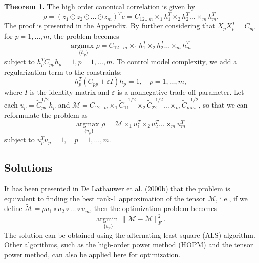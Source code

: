 \documentclass[a4paper,14pt]{article}
\renewcommand{\epsilon}{\ensuremath{\varepsilon}}
\theoremstyle{plain} %
\theoremstyle{definition} %
\theoremstyle{remark} %
\theoremstyle{definition}
\theoremstyle{remark}
\theoremstyle{remark}
\begin{document}
	\textbf{Theorem 1.} The high order canonical correlation is given by
	\[
	\rho = (z_1 \odot z_2 \odot \dots \odot z_m)^T e = C_{12\ldots m} \times_1 h_1^T \times_2 h_2^T \dots \times_m h_m^T.
	\]
	The proof is presented in the Appendix. By further considering that $X_p X_p^T = C_{pp}$ for $p = 1, \dots, m$, the problem becomes
	\[
	\underset{\{h_p\}}{\text{argmax }} \rho = C_{12\ldots m} \times_1 h_1^T \times_2 h_2^T \dots \times_m h_m^T
	\]
	subject to $h_p^T C_{pp} h_p = 1, p = 1, \dots, m$.
	To control model complexity, we add a regularization term to the constraints:
	\[
	h_p^T (C_{pp} + \epsilon I) h_p = 1, \quad p = 1, \dots, m,
	\]
	where $I$ is the identity matrix and $\epsilon$ is a nonnegative trade-off parameter. Let each $u_p = \tilde{C}_{pp}^{1/2} h_p$ and $\mathcal{M} = C_{12\ldots m} \times_1 \tilde{C}_{11}^{-1/2} \times_2 \tilde{C}_{22}^{-1/2} \dots \times_m \tilde{C}_{mm}^{-1/2}$, so that we can reformulate the problem as
	\[
	\underset{\{u_p\}}{\text{argmax }} \rho = \mathcal{M} \times_1 u_1^T \times_2 u_2^T \dots \times_m u_m^T
	\]
	subject to $u_p^T u_p = 1, \quad p = 1, \dots, m$.
	
	\subsection{Solutions}
	
	It has been presented in De Lathauwer et al. (2000b) that the problem is equivalent to finding the best rank-1 approximation of the tensor $\mathcal{M}$, i.e., if we define $\tilde{\mathcal{M}} = \rho u_1 \circ u_2 \circ \dots \circ u_m$, then the optimization problem becomes
	\[
	\underset{\{u_p\}}{\text{argmin }} \|\mathcal{M} - \tilde{\mathcal{M}}\|_F^2.
	\]
	The solution can be obtained using the alternating least square (ALS) algorithm. Other algorithms, such as the high-order power method (HOPM) and the tensor power method, can also be applied here for optimization.
\end{document}
